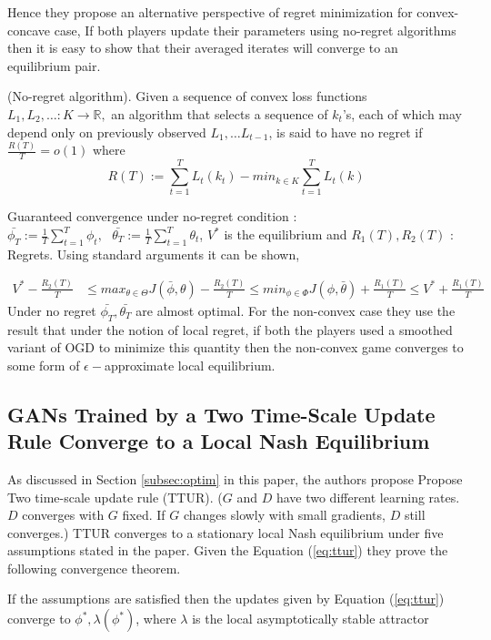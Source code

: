 Hence they propose an alternative perspective of regret minimization for convex-concave case,
If both players update their parameters using no-regret algorithms then it is easy to show that their averaged iterates will converge to an equilibrium pair.
\begin{definition}(No-regret algorithm). Given a sequence of convex loss functions $L_{1}, L_{2}, \ldots : K \rightarrow \mathbb{R},$ an algorithm that selects a sequence of $k_{t}$'s, each of which may depend only on previously observed $L_{1}, \ldots L_{t-1}$, is said to have no regret if $\frac{R(T)}{T} = o(1)$ where $$R(T) := \sum_{t=1}^T L_{t}(k_{t}) - min_{k \in K}\sum_{t=1}^T L_{t}(k) $$
\end{definition}
Guaranteed convergence under no-regret condition : $\bar{\phi_{T}} := \frac{1}{T}\sum_{t=1}^T \phi_{t},\mbox{ }\bar{\theta_{T}} := \frac{1}{T}\sum_{t=1}^T \theta_{t}$,  $V^*$ is the equilibrium and $R_{1}(T), R_{2}(T)$ : Regrets. Using standard arguments it can be shown, 

\begin{equation*}
    \begin{aligned}
    V^* - \frac{R_{2}(T)}{T} & \leq max_{\theta \in \Theta} J(\bar{\phi},\theta) - \frac{R_{2}(T)}{T} 
     \leq min_{\phi \in \Phi } J(\phi, \bar{\theta}) + \frac{R_{1}(T)}{T} 
      \leq V^* + \frac{R_{1}(T)}{T}
    \end{aligned}{}
\end{equation*}{}
 Under no regret $\bar{\phi_{T}}, \bar{\theta_{T}}$ are almost optimal. For the non-convex case they use the result that under the notion of local regret, if both the players used a smoothed variant of OGD to minimize this quantity then the non-convex game converges to some form of $\epsilon-$approximate local equilibrium.

\subsection*{GANs Trained by a Two Time-Scale Update Rule Converge to a Local Nash Equilibrium \citep{ttur}}
As discussed in Section \ref{subsec:optim} in this paper, the authors propose Propose  Two time-scale update rule (TTUR). ($G$ and $D$ have two different learning rates. $D$ converges with $G$ fixed. If $G$ changes slowly with small gradients, $D$ still converges.)
 TTUR converges to a stationary local Nash equilibrium under five assumptions stated in the paper. Given the Equation (\ref{eq:ttur}) they prove the following convergence theorem.
\begin{theorem}
If the assumptions are satisfied then the updates given by Equation (\ref{eq:ttur}) converge to $\phi^*, \lambda(\phi^*)$, where $\lambda$ is the local asymptotically stable attractor
\end{theorem}{}


